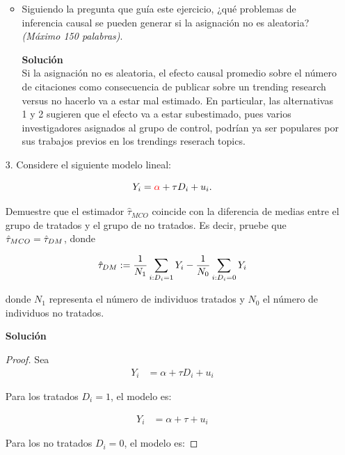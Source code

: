 \documentclass[a4paper, answers, addpoints, 11pt]{exam}
\begin{document}
\begin{itemize}
\begin{itemize}
        \item Siguiendo la pregunta que guía este ejercicio, ¿qué problemas de inferencia causal se pueden generar si la asignación no es aleatoria? \textit{(Máximo 150 palabras)}.
         \begin{mdframed}
        \textbf{Solución}\\
        Si la asignación no es aleatoria, el efecto causal promedio sobre el número de citaciones como consecuencia de publicar sobre un trending research versus no hacerlo  va a estar mal estimado. En particular, las alternativas 1 y 2 sugieren que el efecto va a estar subestimado, pues varios investigadores asignados al grupo de control, podrían ya ser populares por sus trabajos previos en los trendings reserach topics.
        \end{mdframed}
    \end{itemize}

    \item[3.] Considere el siguiente modelo lineal:


    \begin{equation*} Y_i = \textcolor{red}{\alpha}+ \tau D_i + u_i. \end{equation*}

    Demuestre que el estimador $\hat\tau_{MCO}$ coincide con la diferencia de medias entre el grupo de tratados y el grupo de no tratados. Es decir, pruebe que $\hat\tau_{\scriptsize{MCO}} = \hat\tau_{\scriptsize{DM}}$, donde

    \begin{equation*} \hat\tau_{\scriptsize{DM}} := \frac{1}{N_1}\sum_{{i : D_i = 1}} Y_i - \frac{1}{N_0}\sum_{{i : D_i = 0}} Y_i \end{equation*}

    donde $N_1$ representa el número de individuos tratados y $N_0$ el número de individuos no tratados.
 \begin{mdframed}
        \textbf{Solución}\\
        \begin{proof}
        Sea
  \begin{align} \label{estmco}
    Y_i &= \alpha + \tau D_i + u_i
\end{align}

Para los tratados $D_i=1$, el modelo es:

\begin{align*}
    Y_i &= \alpha + \tau + u_i
\end{align*}

Para los no tratados $D_i=0$, el modelo es:


\end{proof}
\end{mdframed}
\end{itemize}
\end{document}
